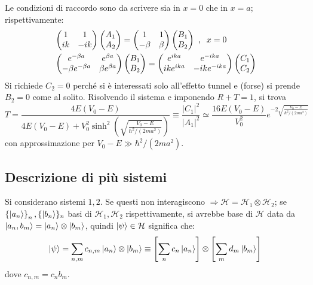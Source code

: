 \documentclass[10pt, a4paper]{scrartcl}
\numberwithin{equation}{subsection}
\theoremstyle{style1}
\begin{document}
Le condizioni di raccordo sono da scrivere sia in $x=0$ che in $x=a$; rispettivamente:
\begin{equation*}
	\begin{split}
		&\begin{pmatrix} 1 & 1 \\ ik & - ik  \end{pmatrix} \begin{pmatrix} A_1 \\ A_2 \end{pmatrix} = \begin{pmatrix} 1&1 \\ -\beta  & \beta  \end{pmatrix} \begin{pmatrix} B_1 \\ B_2 \end{pmatrix} \ ,\hspace{.2cm} x = 0\\
		& \begin{pmatrix} e^{-\beta  a } & e^{ \beta a} \\ -\beta e^{-\beta a} & \beta e^{\beta a}  \end{pmatrix}  \begin{pmatrix} B_1 \\ B_2 \end{pmatrix} = \begin{pmatrix} e^{ika} & e ^{-ika} \\ ik e^{ika} & - ik e^{-ika}  \end{pmatrix} \begin{pmatrix} C_1 \\ C_2 \end{pmatrix} 
	\end{split}
\end{equation*}
Si richiede $C_2=0$ perch\'e si \`e interessati solo all'effetto tunnel e (forse) si prende $B_2=0$ come al solito. Risolvendo il sistema e imponendo $R+T =1$, si trova 
\begin{equation}
	T = \frac{4E (V_0-E)}{4E ( V_0-E) + V_0^2 \operatorname{sinh}^2 \left(\sqrt{\frac{V_0-E}{\hbar ^2 / (2ma^2)}} \right)  } \equiv \frac{\lvert C_1 \rvert ^2}{\lvert A_1 \rvert ^2} \simeq \frac{16 E (V_0-E)}{V_0^2} e^{ -2 \sqrt{\frac{V_0-E}{\hbar ^2 / (2ma^2)}} } 
\end{equation}
con approssimazione per $V_0-E \gg \hbar ^2 / (2ma^2)$.

\subsection{Descrizione di pi\`u sistemi}
Si considerano sistemi $1,2$. Se questi non interagiscono $\Rightarrow  \mathcal{H} = \mathcal{H}_1 \otimes \mathcal{H}_2$; se $\left\{ \ket{a_n} \right\}_n , \{\ket{b_n}\}_n $ basi di $\mathcal{H}_1, \mathcal{H}_2$ rispettivamente, si avrebbe base di $\mathcal{H}$ data da $\ket{a_n,b_m} = \ket{a_n} \otimes \ket{b_m}  $, quindi $\ket{\psi } \in \mathcal{H}$ significa che:
\[
\ket{\psi } = \sum_{n,m}^{} c_{n,m} \ket{a_n} \otimes \ket{b_m} \equiv \left[ \sum_{n}^{} c_n \ket{a_n}  \right] \otimes \left[ \sum_{m}^{} d_m \ket{b_m} \right] 
\] 
dove $c_{n,m}  = c_n b_m$.
\end{document}
